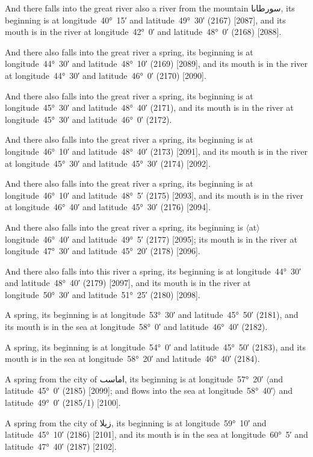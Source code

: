 \documentclass[11pt]{article}
\newcommand{\Pg}[1]{\marginpar{\footnotesize #1}}
\newcommand{\Ang}[1]{\ensuremath{#1}}
\begin{document}
And there falls into the great river also a river from the mountain \textarabic{سورطاٮا}, its beginning is at longitude~40°~15′ and latitude~49°~30′ (2167) [2087], and its mouth is in the river at longitude~42°~0′ and latitude~48°~0′ (2168) [2088].

And there also falls into the great river a spring, its beginning is at longitude~44°~30′ and latitude~48°~10′ (2169) [2089], and its mouth is in the river at longitude~44°~30′ and latitude~46°~0′ (2170) [2090].

And there also falls into the great river a spring, its beginning is at longitude~45°~30′ and latitude~48°~40′ (2171), and its mouth is in the river at longitude~45°~30′ and latitude~46°~0′ (2172)\Pg{p. 144}.

And there also falls into the great river a spring, its beginning is at longitude~46°~10′ and latitude~48°~40′ (2173) [2091], and its mouth is in the river at longitude~45°~30′ and latitude~45°~30′ (2174) [2092].

And there also falls into the great river a spring, its beginning is at longitude~46°~10′ and latitude~48°~5′ (2175) [2093], and its mouth is in the river at longitude~46°~40′ and latitude~45°~30′ (2176) [2094].

And there also falls into the great river a spring, its beginning is \Ang{\langle}at\Ang{\rangle} longitude~46°~40′ and latitude~49°~5′ (2177) [2095]; its mouth is in the river at longitude~47°~30′ and latitude~45°~20′ (2178) [2096].

And there also falls into this river a spring, its beginning is at longitude~44°~30′ and latitude~48°~40′ (2179) [2097], and its mouth is in the river at longitude~50°~30′ and latitude~51°~25′ (2180) [2098].

A spring, its beginning is at longitude~53°~30′ and latitude~45°~50′ (2181), and its mouth is in the sea at longitude~58°~0′ and latitude~46°~40′ (2182).

A spring, its beginning is at longitude~54°~0′ and latitude~45°~50′ (2183), and its mouth is in the sea at longitude~58°~20′ and latitude~46°~40′ (2184).

A spring from the city of \textarabic{اماسٮ}, its beginning is at longitude~57°~20′ \Ang{\langle}and latitude~45°~0′ (2185) [2099]; and flows into the sea at longitude~58°~40′\Ang{\rangle} and latitude~49°~0′ (2185/1) [2100].

A spring from the city of \textarabic{زيلا}, its beginning is at longitude~59°~10′ and latitude~45°~10′ (2186) [2101]\Pg{p. 145}, and its mouth is in the sea at longitude~60°~5′ and latitude~47°~40′ (2187) [2102].
\end{document}
